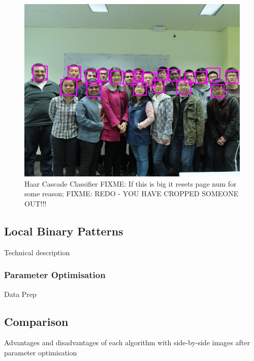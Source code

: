 \documentclass{article}
\begin{document}
\begin{figure}
\centering
\includegraphics[scale=1]{waiting_room_detected.jpg}
\caption{Haar Cascade Classifier FIXME: If this is big it resets page num for some reason; FIXME: REDO - YOU HAVE CROPPED SOMEONE OUT!!!}
\label{fig:haar_cascade}
\end{figure}



\subsection{Local Binary Patterns}
Technical description
\subsubsection{Parameter Optimisation}
Data Prep

\subsection{Comparison}
Advantages and disadvantages of each algorithm with side-by-side images after parameter optimisation
\end{document}
